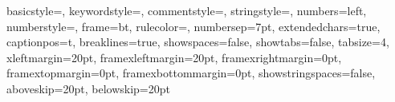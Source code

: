 
\lstset
{
    basicstyle=\footnotesize\ttfamily,
    keywordstyle=\color{blue}, %
    commentstyle=\color{OliveGreen},
    stringstyle=\color{BrickRed},
    numbers=left,
    numberstyle=\color{Gray}\tiny\sf,
    frame=bt, %
    rulecolor=\color{Gray},
    numbersep=7pt,
    extendedchars=true,
    captionpos=t, %
    breaklines=true,
    showspaces=false,
    showtabs=false,
    tabsize=4, 
    xleftmargin=20pt,
    framexleftmargin=20pt,
    framexrightmargin=0pt,
    framextopmargin=0pt,
    framexbottommargin=0pt,
    showstringspaces=false,
    aboveskip=20pt,
    belowskip=20pt
}



